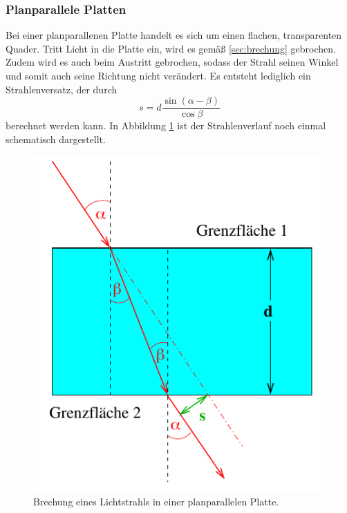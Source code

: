 \subsubsection*{Planparallele Platten}
\label{sec:platten}
Bei einer planparallenen Platte handelt es sich um einen flachen, transparenten Quader. Tritt Licht in die Platte ein, wird
es gemäß \ref{sec:brechung} gebrochen. Zudem wird es auch beim Austritt gebrochen, sodass der Strahl seinen Winkel und
somit auch seine Richtung nicht verändert. Es entsteht lediglich ein Strahlenversatz, der durch
\begin{equation}
    s=d\frac{\sin(\alpha-\beta)}{\cos\beta}
    \label{eqn:strahlenversatz}
\end{equation}
berechnet werden kann. In Abbildung \ref{fig:platten} ist der Strahlenverlauf noch einmal schematisch dargestellt.
\begin{figure}[H]
    \centering
    \includegraphics[scale = 0.5]{pictures/Platte.png}
    \caption{Brechung eines Lichtstrahls in einer planparallelen Platte. \cite{AP01}}
    \label{fig:platten}
\end{figure}

